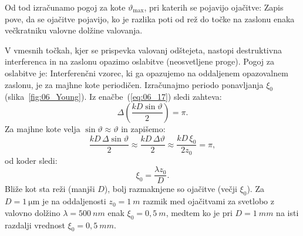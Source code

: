 Od tod izračunamo pogoj za kote $\vartheta_\mathrm{max}$, pri katerih
se pojavijo ojačitve:
Zapis pove, da se ojačitve pojavijo, ko je razlika poti od rež 
do točke na zaslonu enaka večkratniku valovne dolžine valovanja.

V vmesnih točkah, kjer se prispevka valovanj odštejeta, nastopi 
destruktivna interferenca in na zaslonu opazimo oslabitve (neosvetljene proge).
Pogoj za oslabitve je:
Interferenčni vzorec, ki ga opazujemo na oddaljenem opazovalnem zaslonu, je za majhne 
kote periodičen. Izračunajmo periodo ponavljanja $\xi_0$ (slika~\ref{fig:06_Young}). 
Iz enačbe~(\ref{eq:06_17}) sledi zahteva:
\begin{equation}
\Delta \left(\frac{kD\sin \vartheta}{2}\right) = \pi.
\label{eq:06_19}
\end{equation}
Za majhne kote velja $\sin \vartheta \approx \vartheta$ in zapišemo: 
\begin{equation}
\frac{k D\,\Delta \sin\vartheta}{2} \approx \frac{k D\, \Delta \vartheta}{2}
 \approx \frac{k D\,\xi_0}{2z_0} = \pi,
\label{eq:06_20}
\end{equation}
od koder sledi:
\begin{equation}
\xi_0 = \frac{\lambda z_0}{D}.
\label{eq:06_21}
\end{equation}
Bliže kot sta reži (manjši $D$), bolj razmaknjene so ojačitve (večji $\xi_0$). 
Za $D=1~\si{\micro\metre}$ je na oddaljenosti $z_0 = 1~\si{m}$ razmik med ojačitvami za 
svetlobo z valovno dolžino $\lambda  = 500~\si{nm}$ enak $\xi_0 = 0,5~\si{m}$, 
medtem ko je pri $D = 1~\si{mm}$ na isti razdalji vrednost $\xi_0 = 0,5~\si{mm}$. 

